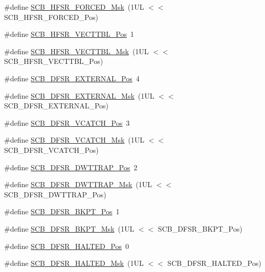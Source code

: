 \begin{DoxyCompactItemize}
\#define \mbox{\hyperlink{group___c_m_s_i_s___s_c_b_ga6560d97ed043bc01152a7247bafa3157}{S\+C\+B\+\_\+\+H\+F\+S\+R\+\_\+\+F\+O\+R\+C\+E\+D\+\_\+\+Msk}}~(1\+U\+L $<$$<$ S\+C\+B\+\_\+\+H\+F\+S\+R\+\_\+\+F\+O\+R\+C\+E\+D\+\_\+\+Pos)
\item 
\#define \mbox{\hyperlink{group___c_m_s_i_s___s_c_b_ga77993da8de35adea7bda6a4475f036ab}{S\+C\+B\+\_\+\+H\+F\+S\+R\+\_\+\+V\+E\+C\+T\+T\+B\+L\+\_\+\+Pos}}~1
\item 
\#define \mbox{\hyperlink{group___c_m_s_i_s___s_c_b_gaac5e289211d0a63fe879a9691cb9e1a9}{S\+C\+B\+\_\+\+H\+F\+S\+R\+\_\+\+V\+E\+C\+T\+T\+B\+L\+\_\+\+Msk}}~(1\+U\+L $<$$<$ S\+C\+B\+\_\+\+H\+F\+S\+R\+\_\+\+V\+E\+C\+T\+T\+B\+L\+\_\+\+Pos)
\item 
\#define \mbox{\hyperlink{group___c_m_s_i_s___s_c_b_ga13f502fb5ac673df9c287488c40b0c1d}{S\+C\+B\+\_\+\+D\+F\+S\+R\+\_\+\+E\+X\+T\+E\+R\+N\+A\+L\+\_\+\+Pos}}~4
\item 
\#define \mbox{\hyperlink{group___c_m_s_i_s___s_c_b_ga3cba2ec1f588ce0b10b191d6b0d23399}{S\+C\+B\+\_\+\+D\+F\+S\+R\+\_\+\+E\+X\+T\+E\+R\+N\+A\+L\+\_\+\+Msk}}~(1\+U\+L $<$$<$ S\+C\+B\+\_\+\+D\+F\+S\+R\+\_\+\+E\+X\+T\+E\+R\+N\+A\+L\+\_\+\+Pos)
\item 
\#define \mbox{\hyperlink{group___c_m_s_i_s___s_c_b_gad02d3eaf062ac184c18a7889c9b6de57}{S\+C\+B\+\_\+\+D\+F\+S\+R\+\_\+\+V\+C\+A\+T\+C\+H\+\_\+\+Pos}}~3
\item 
\#define \mbox{\hyperlink{group___c_m_s_i_s___s_c_b_gacbb931575c07b324ec793775b7c44d05}{S\+C\+B\+\_\+\+D\+F\+S\+R\+\_\+\+V\+C\+A\+T\+C\+H\+\_\+\+Msk}}~(1\+U\+L $<$$<$ S\+C\+B\+\_\+\+D\+F\+S\+R\+\_\+\+V\+C\+A\+T\+C\+H\+\_\+\+Pos)
\item 
\#define \mbox{\hyperlink{group___c_m_s_i_s___s_c_b_gaccf82364c6d0ed7206f1084277b7cc61}{S\+C\+B\+\_\+\+D\+F\+S\+R\+\_\+\+D\+W\+T\+T\+R\+A\+P\+\_\+\+Pos}}~2
\item 
\#define \mbox{\hyperlink{group___c_m_s_i_s___s_c_b_ga3f7384b8a761704655fd45396a305663}{S\+C\+B\+\_\+\+D\+F\+S\+R\+\_\+\+D\+W\+T\+T\+R\+A\+P\+\_\+\+Msk}}~(1\+U\+L $<$$<$ S\+C\+B\+\_\+\+D\+F\+S\+R\+\_\+\+D\+W\+T\+T\+R\+A\+P\+\_\+\+Pos)
\item 
\#define \mbox{\hyperlink{group___c_m_s_i_s___s_c_b_gaf28fdce48655f0dcefb383aebf26b050}{S\+C\+B\+\_\+\+D\+F\+S\+R\+\_\+\+B\+K\+P\+T\+\_\+\+Pos}}~1
\item 
\#define \mbox{\hyperlink{group___c_m_s_i_s___s_c_b_ga609edf8f50bc49adb51ae28bcecefe1f}{S\+C\+B\+\_\+\+D\+F\+S\+R\+\_\+\+B\+K\+P\+T\+\_\+\+Msk}}~(1\+U\+L $<$$<$ S\+C\+B\+\_\+\+D\+F\+S\+R\+\_\+\+B\+K\+P\+T\+\_\+\+Pos)
\item 
\#define \mbox{\hyperlink{group___c_m_s_i_s___s_c_b_gaef4ec28427f9f88ac70a13ae4e541378}{S\+C\+B\+\_\+\+D\+F\+S\+R\+\_\+\+H\+A\+L\+T\+E\+D\+\_\+\+Pos}}~0
\item 
\#define \mbox{\hyperlink{group___c_m_s_i_s___s_c_b_ga200bcf918d57443b5e29e8ce552e4bdf}{S\+C\+B\+\_\+\+D\+F\+S\+R\+\_\+\+H\+A\+L\+T\+E\+D\+\_\+\+Msk}}~(1\+U\+L $<$$<$ S\+C\+B\+\_\+\+D\+F\+S\+R\+\_\+\+H\+A\+L\+T\+E\+D\+\_\+\+Pos)
\end{DoxyCompactItemize}


